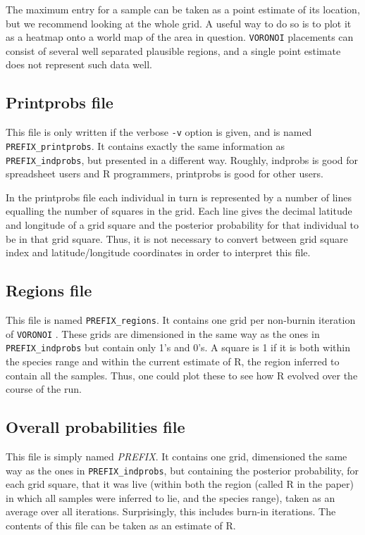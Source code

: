 \documentclass[10pt,titlepage,times,letterpaper]{article}
\def\VORONOI{{\tt VORONOI} }
\begin{document}
The maximum entry for a sample can be taken as a point estimate of its location, but
we recommend looking at the whole grid.  A useful way to do so is to plot it as a heatmap
onto a world map of the area in question.  \VORONOI placements can consist of several
well separated plausible regions, and a single point estimate does not represent
such data well.

\subsection{Printprobs file}

This file is only written if the verbose {\tt -v} option is given, and is named
{\tt PREFIX\_printprobs}.  It contains exactly the same information as 
{\tt PREFIX\_indprobs}, but presented in a different way.  Roughly, indprobs is good for
spreadsheet users and R programmers, printprobs is good for other users.

In the printprobs file each individual in turn is represented by a number of lines
equalling the number of squares in the grid.  Each line gives the decimal latitude and 
longitude of a grid square and the posterior probability for that individual to be
in that grid square.  Thus, it is not necessary to convert between grid square
index and latitude/longitude coordinates in order to interpret this file.

\subsection{Regions file}

This file is named {\tt PREFIX\_regions}.  It contains one grid per non-burnin
iteration of \VORONOI.  These grids are dimensioned in the same way as the ones in
{\tt PREFIX\_indprobs} but contain only 1's and 0's.  A square is 1 if it is both within
the species range and within the current estimate of R, the region inferred to contain all
the samples.  Thus, one could plot these to see how 
R evolved over the course of the run.

\subsection{Overall probabilities file}

This file is simply named {\it PREFIX}.  It contains one grid, dimensioned the same
way as the ones in {\tt PREFIX\_indprobs}, but containing the posterior probability, for
each grid square, that it was live (within both the region (called R in the paper)
in which all samples were
inferred to lie, and the species range), taken as an average over all iterations.  
Surprisingly, this includes burn-in iterations.  The contents of this file can be taken
as an estimate of R.  
\end{document}
